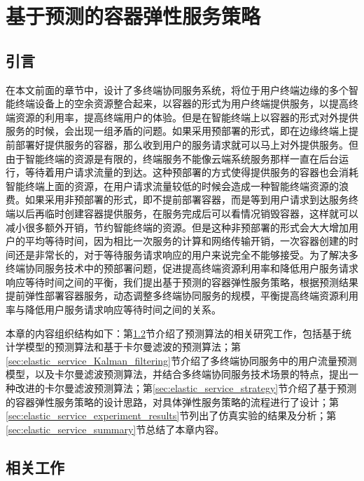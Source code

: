 \chapter{基于预测的容器弹性服务策略 }\label{chap:elastic_service}

\section{引言}

在本文前面的章节中，设计了多终端协同服务系统，将位于用户终端边缘的多个智能终端设备上的空余资源整合起来，以容器的形式为用户终端提供服务，以提高终端资源的利用率，提高终端用户的体验。但是在智能终端上以容器的形式对外提供服务的时候，会出现一组矛盾的问题。如果采用预部署的形式，即在边缘终端上提前部署好提供服务的容器，那么收到用户的服务请求就可以马上对外提供服务。但由于智能终端的资源是有限的，终端服务不能像云端系统服务那样一直在后台运行，等待着用户请求流量的到达。这种预部署的方式使得提供服务的容器也会消耗智能终端上面的资源，在用户请求流量较低的时候会造成一种智能终端资源的浪费。如果采用非预部署的形式，即不提前部署容器，而是等到用户请求到达服务终端以后再临时创建容器提供服务，在服务完成后可以看情况销毁容器，这样就可以减小很多额外开销，节约智能终端的资源。但是这种非预部署的形式会大大增加用户的平均等待时间，因为相比一次服务的计算和网络传输开销，一次容器创建的时间还是非常长的，对于等待服务请求响应的用户来说完全不能够接受。为了解决多终端协同服务技术中的预部署问题，促进提高终端资源利用率和降低用户服务请求响应等待时间之间的平衡，我们提出基于预测的容器弹性服务策略，根据预测结果提前弹性部署容器服务，动态调整多终端协同服务的规模，平衡提高终端资源利用率与降低用户服务请求响应等待时间之间的关系。

本章的内容组织结构如下：第\ref{sec:elastic_service_related_work}节介绍了预测算法的相关研究工作，包括基于统计学模型的预测算法和基于卡尔曼滤波的预测算法；第\ref{sec:elastic_service_Kalman_filtering}节介绍了多终端协同服务中的用户流量预测模型，以及卡尔曼滤波预测算法，并结合多终端协同服务技术场景的特点，提出一种改进的卡尔曼滤波预测算法；第\ref{sec:elastic_service_strategy}节介绍了基于预测的容器弹性服务策略的设计思路，对具体弹性服务策略的流程进行了设计；第\ref{sec:elastic_service_experiment_results}节列出了仿真实验的结果及分析；第\ref{sec:elastic_service_summary}节总结了本章内容。

\section{相关工作}\label{sec:elastic_service_related_work}

